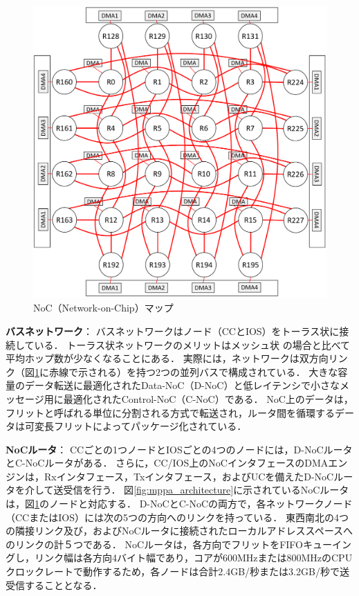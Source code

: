 \documentclass[submit,techrep]{ipsj_v2/UTF8/ipsj}
\begin{document}
\begin{figure}[t]
  \centering
  \includegraphics[width=0.65\linewidth]{../figure/noc_map.pdf}
  \caption{\label{fig:noc_map}
    NoC（Network-on-Chip）マップ}
\end{figure}

\textbf{バスネットワーク}：
バスネットワークはノード（CCとIOS）をトーラス状に接続している\cite{dally2001route}．
トーラス状ネットワークのメリットはメッシュ状\cite{vangal200780} \cite{taylor2002raw}の場合と比べて平均ホップ数が少なくなることにある．
実際には，ネットワークは双方向リンク（図\ref{fig:noc_map}に赤線で示される）を持つ2つの並列バスで構成されている．
大きな容量のデータ転送に最適化されたData-NoC（D-NoC）と低レイテンシで小さなメッセージ用に最適化されたControl-NoC（C-NoC）である．
NoC上のデータは，フリットと呼ばれる単位に分割される方式で転送され，ルータ間を循環するデータは可変長フリットによってパッケージ化されている．

\textbf{NoCルータ}：
CCごとの1つノードとIOSごとの4つのノードには，D-NoCルータとC-NoCルータがある．
さらに，CC/IOS上のNoCインタフェースのDMAエンジンは，Rxインタフェース，Txインタフェース，およびUCを備えたD-NoCルータを介して送受信を行う．
図\ref{fig:mppa_architecture}に示されているNoCルータは，図\ref{fig:noc_map}のノードと対応する．
D-NoCとC-NoCの両方で，各ネットワークノード（CCまたはIOS）には次の5つの方向へのリンクを持っている．
東西南北の4つの隣接リンク及び，およびNoCルータに接続されたローカルアドレススペースへのリンクの計５つである．
NoCルータは，各方向でフリットをFIFOキューイングし，リンク幅は各方向4バイト幅であり，コアが600MHzまたは800MHzのCPUクロックレートで動作するため，各ノードは合計2.4GB/秒または3.2GB/秒で送受信することとなる．
\end{document}
